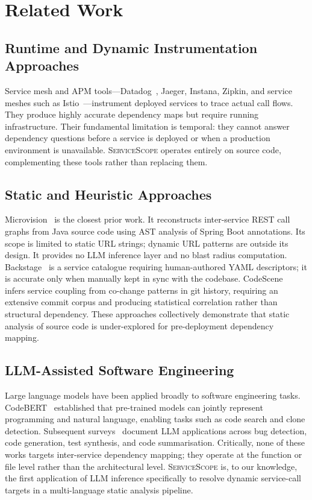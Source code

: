 \documentclass[runningheads]{llncs}
\begin{document}
\section{Related Work}
\label{sec:related}

\subsection{Runtime and Dynamic Instrumentation Approaches}

Service mesh and APM tools---Datadog~\cite{datadog}, Jaeger, Instana,
Zipkin, and service meshes such as Istio~\cite{istio}---instrument deployed
services to trace actual call flows. They
produce highly accurate dependency maps but require running infrastructure.
Their fundamental limitation is temporal: they cannot answer dependency
questions before a service is deployed or when a production environment is
unavailable. \textsc{ServiceScope} operates entirely on source code,
complementing these tools rather than replacing them.

\subsection{Static and Heuristic Approaches}

Microvision~\cite{cerny2022} is the closest prior work. It reconstructs
inter-service REST call graphs from Java source code using AST analysis of
Spring Boot annotations. Its scope is limited to static URL strings;
dynamic URL patterns are outside its design. It provides no LLM inference
layer and no blast radius computation. Backstage~\cite{backstage} is a
service catalogue requiring human-authored YAML descriptors; it is accurate
only when manually kept in sync with the codebase. CodeScene~\cite{codescene} infers service coupling from co-change patterns
in git history, requiring an extensive commit corpus and producing
statistical correlation rather than structural dependency. These approaches collectively demonstrate that
static analysis of source code is under-explored for pre-deployment
dependency mapping.

\subsection{LLM-Assisted Software Engineering}

Large language models have been applied broadly to software engineering
tasks. CodeBERT~\cite{codebert} established that pre-trained models can
jointly represent programming and natural language, enabling tasks such as
code search and clone detection. Subsequent surveys~\cite{zhu2023survey,fan2023llmse}
document LLM applications across bug detection, code generation, test
synthesis, and code summarisation. Critically, none of these works targets
inter-service dependency mapping; they operate at the function or file
level rather than the architectural level. \textsc{ServiceScope} is, to our
knowledge, the first application of LLM inference specifically to resolve
dynamic service-call targets in a multi-language static analysis pipeline.
\end{document}
